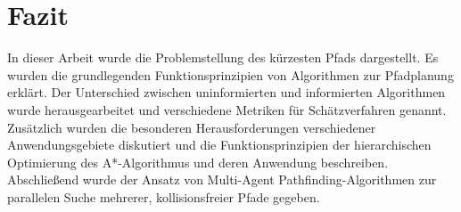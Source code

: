 \chapter{Fazit}

In dieser Arbeit wurde die Problemstellung des kürzesten Pfads dargestellt. Es wurden die grundlegenden Funktionsprinzipien von Algorithmen zur Pfadplanung erklärt. Der Unterschied zwischen uninformierten und informierten Algorithmen wurde herausgearbeitet und verschiedene Metriken für Schätzverfahren genannt. Zusätzlich wurden die besonderen Herausforderungen verschiedener Anwendungsgebiete diskutiert und die Funktionsprinzipien der hierarchischen Optimierung des A*-Algorithmus und deren Anwendung beschreiben. Abschließend wurde der Ansatz von Multi-Agent Pathfinding-Algorithmen zur parallelen Suche mehrerer, kollisionsfreier Pfade gegeben.
